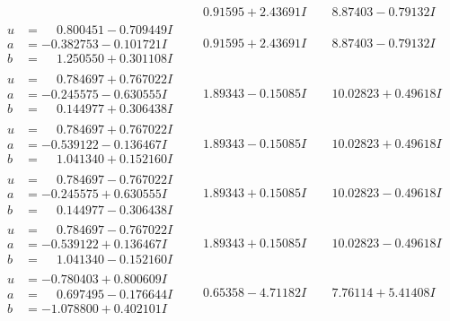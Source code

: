 \documentclass[1p]{elsarticle_modified}
\theoremstyle{definition}
\begin{document}
$$\begin{array}{c|c|c}
 & \phantom{-}0.91595 + 2.43691 I & \phantom{-}8.87403 - 0.79132 I \\ \hline\begin{aligned}
u &= \phantom{-}0.800451 - 0.709449 I \\
a &= -0.382753 - 0.101721 I \\
b &= \phantom{-}1.250550 + 0.301108 I\end{aligned}
 & \phantom{-}0.91595 + 2.43691 I & \phantom{-}8.87403 - 0.79132 I \\ \hline\begin{aligned}
u &= \phantom{-}0.784697 + 0.767022 I \\
a &= -0.245575 - 0.630555 I \\
b &= \phantom{-}0.144977 + 0.306438 I\end{aligned}
 & \phantom{-}1.89343 - 0.15085 I & \phantom{-}10.02823 + 0.49618 I \\ \hline\begin{aligned}
u &= \phantom{-}0.784697 + 0.767022 I \\
a &= -0.539122 - 0.136467 I \\
b &= \phantom{-}1.041340 + 0.152160 I\end{aligned}
 & \phantom{-}1.89343 - 0.15085 I & \phantom{-}10.02823 + 0.49618 I \\ \hline\begin{aligned}
u &= \phantom{-}0.784697 - 0.767022 I \\
a &= -0.245575 + 0.630555 I \\
b &= \phantom{-}0.144977 - 0.306438 I\end{aligned}
 & \phantom{-}1.89343 + 0.15085 I & \phantom{-}10.02823 - 0.49618 I \\ \hline\begin{aligned}
u &= \phantom{-}0.784697 - 0.767022 I \\
a &= -0.539122 + 0.136467 I \\
b &= \phantom{-}1.041340 - 0.152160 I\end{aligned}
 & \phantom{-}1.89343 + 0.15085 I & \phantom{-}10.02823 - 0.49618 I \\ \hline\begin{aligned}
u &= -0.780403 + 0.800609 I \\
a &= \phantom{-}0.697495 - 0.176644 I \\
b &= -1.078800 + 0.402101 I\end{aligned}
 & \phantom{-}0.65358 - 4.71182 I & \phantom{-}7.76114 + 5.41408 I \\ \hline\begin{aligned}

\end{aligned}
\end{array}$$
\end{document}
